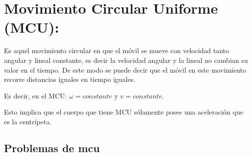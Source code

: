 \documentclass[a5paper,pagesize,10pt,bibtotoc,pointlessnumbers,
normalheadings,DIV=9,fleqn,x11names,table,twoside=false]{scrbook}
\begin{document}
\section{Movimiento Circular Uniforme (MCU):}

Es aquel movimiento circular en que el móvil se mueve con velocidad tanto angular y lineal constante, es decir la velocidad 
angular y la lineal no cambian su valor en el tiempo. De este modo se puede decir que el móvil en este movimiento recorre 
distancias iguales en tiempo iguales. 

\begin{tcolorbox}
Es decir, en el MCU: $\omega = constante$ y $v = constante.$
\end{tcolorbox}

Esto implica que el cuerpo que tiene MCU sólamente posee una aceleración que es la centrípeta.

\subsection{Problemas de mcu}
\end{document}
